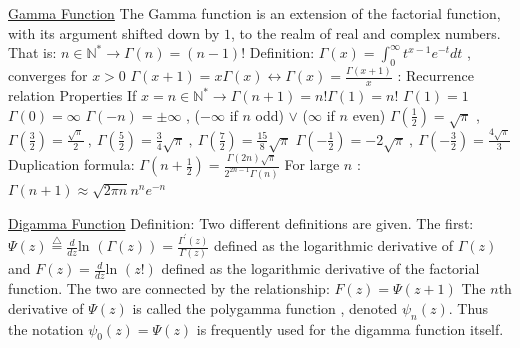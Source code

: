 \documentclass[12pt]{article}
\def\ln{\text{ln\ }} %
\begin{document}
\begin{flushleft}
	\uline{Gamma Function} \linebreak 
	The Gamma function is an extension of the factorial function, with its argument shifted down by $1$, to the realm of real and complex numbers. That is: \linebreak 
	$\displaystyle n \in \mathbb{N^*} \rightarrow \Gamma (n) = (n-1)!$ \linebreak 
	\textbullet \quad Definition: $\displaystyle \Gamma (x) = \int_0^{\infty} t^{x-1} e^{-t} dt $ , converges for $x>0$ \linebreak 
	$\displaystyle \Gamma (x+1) = x \Gamma (x) \leftrightarrow \Gamma (x) = \frac{\Gamma (x+1)}{x} $  :  Recurrence relation \linebreak 
	Properties \linebreak 
	\textbullet \quad If $x=n \in \mathbb{N}^* \rightarrow \Gamma (n+1) = n! \Gamma (1) = n!$ \linebreak 
	\textbullet \quad $\Gamma (1) = 1$ \linebreak 
	\textbullet \quad $\Gamma (0) = \infty $ \linebreak 
	\textbullet \quad $\Gamma (-n) = \pm \infty $ , ($-\infty$ if $n$ odd) $\lor$ ($\infty$ if $n$ even) \linebreak 
	\textbullet \quad $\displaystyle \Gamma (\frac{1}{2}) = \sqrt{\pi}$ , $\displaystyle \Gamma ( \frac{3}{2} ) = \frac{\sqrt{\pi}}{2} \ , \ \Gamma (\frac{5}{2} ) = \frac{3}{4} \sqrt{\pi} \ , \ \Gamma (\frac{7}{2}) = \frac{15}{8} \sqrt{\pi} $ \linebreak 
	$\displaystyle \Gamma ( -\frac{1}{2} ) = -2 \sqrt{\pi} \ , \ \Gamma (-\frac{3}{2}) = \frac{4\sqrt{\pi}}{3} $ \linebreak 
	\textbullet \quad Duplication formula: $\displaystyle \Gamma \left(n+\frac{1}{2}\right) = \frac{\Gamma(2n)\sqrt{\pi}}{2^{2n-1}\Gamma (n)} $ \linebreak 
	\textbullet \quad For large $n$  :  $\Gamma (n+1) \approx \sqrt{2\pi n} n^n e^{-n} $ \linebreak 
	
	\uline{Digamma Function} \linebreak 
	\textbullet \quad Definition: Two different definitions are given. The first: \linebreak 
	$\displaystyle \Psi (z) \overset{\triangle}{=} \frac{d}{dz}\ln \left(\Gamma (z)\right) = \frac{\Gamma ^{\prime} (z)}{\Gamma (z)} $ defined as the logarithmic derivative of $\Gamma(z)$ and \linebreak 
	$\displaystyle F(z) = \frac{d}{dz} \ln(z!)$ defined as the logarithmic derivative of the factorial function. \linebreak 
	\textbullet \quad The two are connected by the relationship: \linebreak 
	$\displaystyle F(z) = \Psi (z+1)$ \linebreak 
	\textbullet \quad The $n$th derivative of $\Psi (z)$ is called the polygamma function , denoted $\psi_n (z)$. Thus the notation $\psi_0 (z) = \Psi (z)$ is frequently used for the digamma function itself. \linebreak 
	

\end{flushleft}
\end{document}
